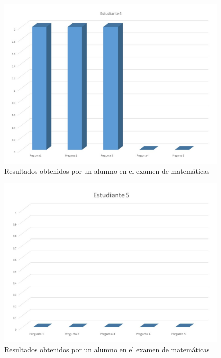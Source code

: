 \documentclass[12pt] {report}
\begin{document}
\begin{figure}[H]
\centering 
\includegraphics[scale=.7]{MEstudiante4.JPG}
\caption{Resultados obtenidos por un alumno en el examen de matemáticas}
\end{figure}
\begin{figure}[H]
\centering 
\includegraphics[scale=.7]{MEstudiante5.JPG}
\caption{Resultados obtenidos por un alumno en el examen de matemáticas}
\end{figure}
\end{document}
